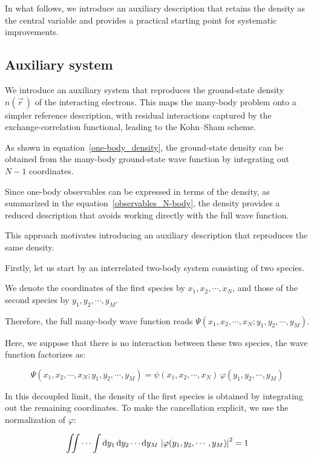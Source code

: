 In what follows, we introduce an auxiliary description that retains the density as the central variable and provides a practical starting point for systematic improvements.

\subsection{Auxiliary system}

We introduce an auxiliary system that reproduces the ground-state density $n(\vec{r}\,)$ of the interacting electrons.
This maps the many-body problem onto a simpler reference description, with residual interactions captured by the exchange-correlation functional, leading to the Kohn--Sham scheme.

As shown in equation~\eqref{one-body_density}, the ground-state density can be obtained from the many-body ground-state wave function by integrating out $N-1$ coordinates.

Since one-body observables can be expressed in terms of the density, as summarized in the equation~\eqref{observables_N-body}, the density provides a reduced description that avoids working directly with the full wave function. 

This approach motivates introducing an auxiliary description that reproduces the same density.

Firstly, let us start by an interrelated two-body system consisting of two species.

We denote the coordinates of the first species by $x_1,x_2,\cdots,x_N$,
and those of the second species by $y_1,y_2,\cdots,y_M$.

Therefore, the full many-body wave function reads $\Psi(x_1,x_2,\cdots,x_N;y_1,y_2,\cdots,y_M)$.

Here, we suppose that there is no interaction between these two species, the wave function factorizes as:

\begin{equation}
    \Psi(x_1,x_2,\cdots,x_N;y_1,y_2,\cdots,y_M)
    =\psi(x_1,x_2,\cdots,x_N)\,\varphi(y_1,y_2,\cdots,y_M)
\label{separate_two-body_wave_function}
\end{equation}

In this decoupled limit, the density of the first species is obtained by integrating out the remaining coordinates.
To make the cancellation explicit, we use the normalization of $\varphi$:

\begin{equation}
    \iint\cdots\int\mathrm{d}{y_1}\,\mathrm{d}{y_2}\cdots\mathrm{d}{y_M}\,\left|\varphi(y_1,y_2,\cdots,y_M)\right|^2 = 1
\label{phi_normalization}
\end{equation}

